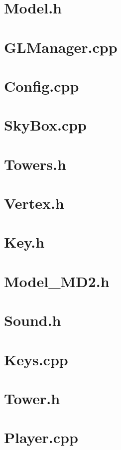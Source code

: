 \section{Model.h}

\pagebreak
\section{GLManager.cpp}

\pagebreak
\section{Config.cpp}

\pagebreak
\section{SkyBox.cpp}

\pagebreak
\section{Towers.h}

\pagebreak
\section{Vertex.h}

\pagebreak
\section{Key.h}

\pagebreak
\section{Model\_MD2.h}

\pagebreak
\section{Sound.h}

\pagebreak
\section{Keys.cpp}

\pagebreak
\section{Tower.h}

\pagebreak
\section{Player.cpp}

\pagebreak
